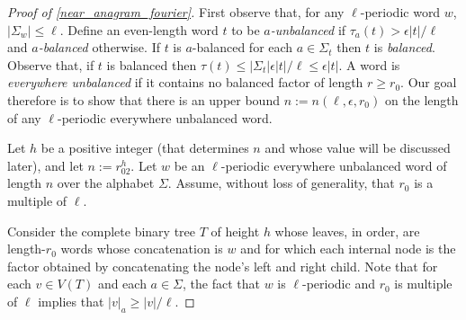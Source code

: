 \documentclass{patmorin}
\begin{document}
\begin{proof}[Proof of \cref{near_anagram_fourier}]
    First observe that, for any $\ell$-periodic word $w$, $|\Sigma_w|\le\ell$.
    Define an even-length word $t$ to be \emph{$a$-unbalanced} if $\tau_a(t)>\epsilon|t|/\ell$ and \emph{$a$-balanced} otherwise.  If $t$ is $a$-balanced for each $a\in\Sigma_t$ then $t$ is \emph{balanced}. Observe that, if $t$ is balanced then $\tau(t)\le |\Sigma_t|\epsilon|t|/\ell\le \epsilon|t|$. A word is \emph{everywhere unbalanced} if it contains no balanced factor of length $r\ge r_0$. Our goal therefore is to show that there is an upper bound $n:=n(\ell,\epsilon,r_0)$ on the length of any $\ell$-periodic everywhere unbalanced word.

    Let $h$ be a positive integer (that determines $n$ and whose value will be discussed later), and let $n:=r_02^{h}$. Let $w$ be an $\ell$-periodic everywhere unbalanced word of length $n$ over the alphabet $\Sigma$.  Assume, without loss of generality, that $r_0$ is a multiple of $\ell$.

    Consider the complete binary tree $T$ of height $h$ whose leaves, in order, are length-$r_0$ words whose concatenation is $w$ and for which each internal node is the factor obtained by concatenating the node's left and right child.
    Note that for each $v\in V(T)$ and each $a\in\Sigma$, the fact that $w$ is $\ell$-periodic and $r_0$ is multiple of $\ell$ implies that $|v|_{a}\ge |v|/\ell$.





\end{proof}
\end{document}
